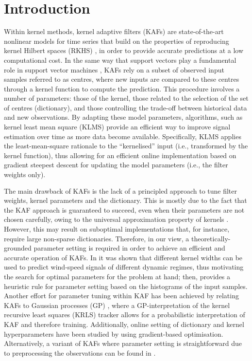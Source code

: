 \section{Introduction}

Within kernel methods, kernel adaptive filters (KAFs) \cite{liu2010} are state-of-the-art nonlinear models for time series that build on the properties of reproducing kernel Hilbert spaces (RKHS) \cite{aronszajn1950theory}, in order to provide accurate predictions at a low computational cost. In the same way that support vectors play a fundamental role in support vector machines \cite{scholkopf01}, KAFs rely on a subset of observed input samples referred to as centres, where new inputs are compared to these centres through a kernel function to compute the prediction. This procedure involves a number of parameters: those of the kernel, those related to the selection of the set of centres (dictionary), and those controlling the trade-off between historical data and new observations. By adapting these model parameters, algorithms, such as kernel least mean square (KLMS) \cite{liu08,richard09} provide an efficient way to improve signal estimation over time as more data become available. Specifically, KLMS applies the least-mean-square rationale to the ``kernelised'' input (i.e., transformed by the kernel function), thus allowing for an efficient online implementation based on gradient steepest descent for updating the model parameters (i.e., the filter weights only).

The main drawback of KAFs is the lack of a principled approach to tune filter weights, kernel parameters and the dictionary. This is mostly due to the fact that the KAF approach is guaranteed to succeed, even when their parameters are not chosen carefully, owing to the universal approximation property of kernels \cite{steinwart01}. However, this may result on suboptimal implementations that, for instance, require large non-sparse dictionaries. Therefore, in our view, a theoretically-grounded parameter setting is required in order to achieve an efficient and accurate operation of KAFs. In \cite{tobar14mk} it was shown that different kernel widths can be used to predict wind-speed signals of different dynamic regimes, thus motivating the search for optimal parameters for the problem at hand; then, \cite{tobar_quat} provides a heuristic rule for parameter setting based on the histograms of the input samples. Another effort for parameter tuning within KAF has been achieved by relating KAFs to Gaussian processes (GP) \cite{rasmussen06}, where a GP-interpretation of the kernel recursive least squares (KRLS) tracker \cite{van2012kernel} allows for a probabilistic interpretation of KAF and therefore training. Additionally, online setting of dictionary and kernel hyperparameters have been studied by \cite{wang2015,chen2016kernel,fan2016kernel} using gradient-based optimisation. Alternatively, a variant of KAFs where parameter setting is straightforward due to preprocessing the observations can be found in \cite{dsp2017b}.

